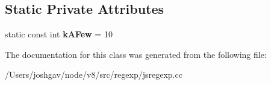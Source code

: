 \subsection*{Static Private Attributes}
\begin{DoxyCompactItemize}
\item 
static const int {\bfseries k\+A\+Few} = 10\hypertarget{classv8_1_1internal_1_1_alternative_generation_list_a70fc4fd2e074b5218a3ea5a28be625bd}{}\label{classv8_1_1internal_1_1_alternative_generation_list_a70fc4fd2e074b5218a3ea5a28be625bd}

\end{DoxyCompactItemize}


The documentation for this class was generated from the following file\+:\begin{DoxyCompactItemize}
\item 
/\+Users/joshgav/node/v8/src/regexp/jsregexp.\+cc\end{DoxyCompactItemize}
